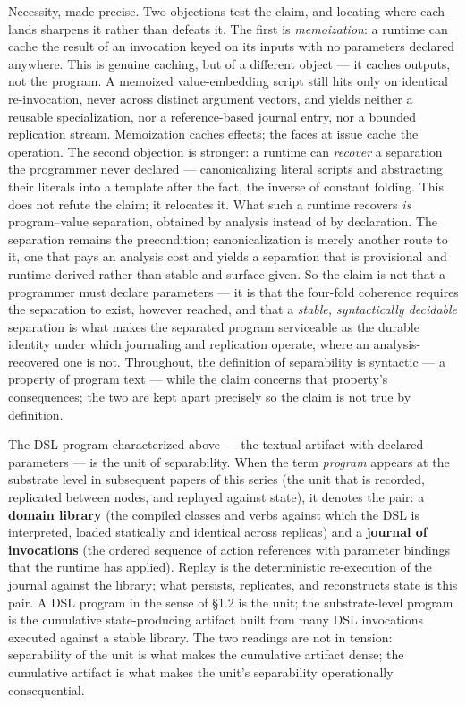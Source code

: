 \documentclass[
]{article}
\begin{document}
Necessity, made precise. Two objections test the claim, and locating
where each lands sharpens it rather than defeats it. The first is
\emph{memoization}: a runtime can cache the result of an invocation
keyed on its inputs with no parameters declared anywhere. This is
genuine caching, but of a different object --- it caches outputs, not
the program. A memoized value-embedding script still hits only on
identical re-invocation, never across distinct argument vectors, and
yields neither a reusable specialization, nor a reference-based journal
entry, nor a bounded replication stream. Memoization caches effects; the
faces at issue cache the operation. The second objection is stronger: a
runtime can \emph{recover} a separation the programmer never declared
--- canonicalizing literal scripts and abstracting their literals into a
template after the fact, the inverse of constant folding. This does not
refute the claim; it relocates it. What such a runtime recovers
\emph{is} program--value separation, obtained by analysis instead of by
declaration. The separation remains the precondition; canonicalization
is merely another route to it, one that pays an analysis cost and yields
a separation that is provisional and runtime-derived rather than stable
and surface-given. So the claim is not that a programmer must declare
parameters --- it is that the four-fold coherence requires the
separation to exist, however reached, and that a \emph{stable,
syntactically decidable} separation is what makes the separated program
serviceable as the durable identity under which journaling and
replication operate, where an analysis-recovered one is not. Throughout,
the definition of separability is syntactic --- a property of program
text --- while the claim concerns that property's consequences; the two
are kept apart precisely so the claim is not true by definition.

The DSL program characterized above --- the textual artifact with
declared parameters --- is the unit of separability. When the term
\emph{program} appears at the substrate level in subsequent papers of
this series (the unit that is recorded, replicated between nodes, and
replayed against state), it denotes the pair: a \textbf{domain library}
(the compiled classes and verbs against which the DSL is interpreted,
loaded statically and identical across replicas) and a \textbf{journal
of invocations} (the ordered sequence of action references with
parameter bindings that the runtime has applied). Replay is the
deterministic re-execution of the journal against the library; what
persists, replicates, and reconstructs state is this pair. A DSL program
in the sense of §1.2 is the unit; the substrate-level program is the
cumulative state-producing artifact built from many DSL invocations
executed against a stable library. The two readings are not in tension:
separability of the unit is what makes the cumulative artifact dense;
the cumulative artifact is what makes the unit's separability
operationally consequential.
\end{document}
